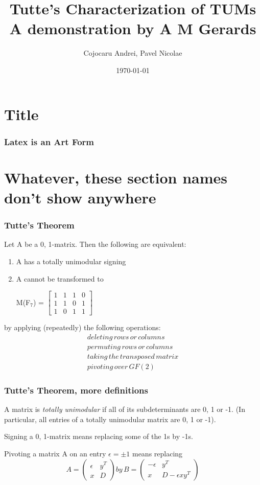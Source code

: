 \documentclass{beamer}
\title{Tutte's Characterization of TUMs\\A demonstration by A M Gerards}
\author{Cojocaru Andrei, Pavel Nicolae}
\date{\normalsize\today}
\begin{document}
\section{Title}
\frametitle{Latex is an Art Form}
\frame{\titlepage}

\section{Whatever, these section names don't show anywhere}
\begin{frame}
\frametitle{Tutte's Theorem}
\begin{definition}
Let A be a {0, 1}-matrix. Then the following are equivalent:
\begin{enumerate}
\item A has a totally unimodular signing
\item A cannot be transformed to
\begin{center}
M(F$_7$) = $\begin{bmatrix} 1 & 1 &1 & 0 \\ 1 & 1 & 0 & 1 \\ 1 & 0 &1 & 1\end{bmatrix}$
\end{center}
\end{enumerate}
by applying (repeatedly) the following operations:
\begin{equation}
\begin{aligned}
deleting\, rows\, or\, columns\\
permuting\, rows\, or\, columns\\
taking\, the\, transposed\, matrix\\
pivoting\, over\, GF(2)
\end{aligned}
\end{equation}
\end{definition}
\end{frame}

\begin{frame}
\frametitle{Tutte's Theorem, more definitions}
\begin{definition}
A matrix is \emph{totally unimodular} if all of its subdeterminants are 0, 1 or -1. (In particular, all entries of a totally unimodular matrix are 0, 1 or -1).
\end{definition}
\begin{definition}
Signing a {0, 1}-matrix means replacing some of the 1s by -1s.
\end{definition}
\begin{definition}
Pivoting a matrix A on an entry $\epsilon = \pm 1$ means replacing
\begin{equation}
A = \begin{pmatrix}
\epsilon & y^T \\ x & D
\end{pmatrix}
by\, B = \begin{pmatrix}
-\epsilon & y ^T \\ x & D - \epsilon x y^T
\end{pmatrix}
\end{equation}
\end{definition}
\end{frame}
\end{document}
